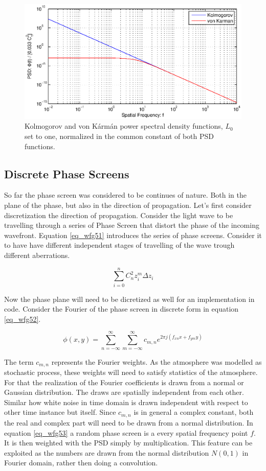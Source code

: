 \documentclass{article}
\begin{document}
\begin{figure}[H]
	\center
	\includegraphics[height=1.0\textwidth, height=.3\textwidth]{Figures/kolmogorov.eps}
	\caption{Kolmogorov and von K{\'a}rm{\'a}n power spectral density functions, $L_0$ set to one, normalized in the common constant of both PSD functions.}
	\label{fig_wfg03}
\end{figure}

\newpage
\subsection{Discrete Phase Screens}
So far the phase screen was considered to be continues of nature. Both in the plane of the phase, but also in the direction of propagation. Let's first consider discretization the direction of propagation. Consider the light wave to be travelling through a series of Phase Screen that distort the phase of the incoming wavefront. Equation \ref{eq_wfg51} \cite{zernikeCircle} introduces the series of phase screens. Consider it to have have different independent stages of travelling of the wave trough different aberrations.

\begin{equation}
\sum \limits_{i=0}^{n} C_n^2 z_i^m \Delta z_i
\label{eq_wfg51}
\end{equation}

Now the phase plane will need to be dicretized as well for an implementation in code. Consider the Fourier  of the phase screen in discrete form in equation \ref{eq_wfg52}.

\begin{equation}
\phi(x,y) = \sum \limits_{n = -\infty}^{\infty} \sum \limits_{m = -\infty}^{\infty} c_{m,n} e^{2 \pi j (f_{xn} x + f_{ym} y)}
\label{eq_wfg52}
\end{equation}

The term $c_{m,n}$ represents the Fourier weights. As the atmosphere was modelled as stochastic process, these weights will need to satisfy statistics of the atmosphere. For that the realization of the Fourier coefficients is drawn from a normal or Gaussian distribution. The draws are spatially independent from each other. Similar how white noise in time domain is drawn independent with respect to other time instance but itself. Since $c_{m,n}$ is in general a complex constant, both the real and complex part will need to be drawn from a normal distribution. In equation \ref{eq_wfg53} a random phase screen is a every spatial frequency point $f$. It is then weighted with the PSD simply by multiplication. This feature can be exploited as the numbers are drawn from the normal distribution $N(0,1)$ in Fourier domain, rather then doing a convolution. 
\end{document}
